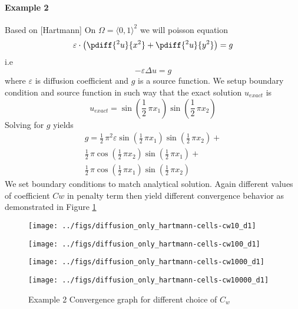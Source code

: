 \newpage
\paragraph{Example 2} Based on [Hartmann]
On $\Omega = \langle 0, 1 \rangle^2$ we will poisson equation
\begin{equation}
\varepsilon \cdot \left( \pdiff{^2 u}{x^2} + \pdiff{^2 u}{y^2} \right) = g
\end{equation}
i.e
\begin{equation}
- \varepsilon \Delta u = g
\end{equation}
where  $\varepsilon$ is diffusion coefficient and $g$ is a source 
function. We setup boundary condition and source function in such way that the exact solution $u_{exact}$ is
\begin{equation}
u_{exact} =  \sin\left(\frac{1}{2} \, \pi x_{1}\right) \sin\left(\frac{1}{2} \, \pi x_{2}\right)
\end{equation}
Solving for $g$ yields
\begin{equation}
\begin{aligned}
	g = \frac{1}{2} \, \pi^{2} \varepsilon \sin\left(\frac{1}{2} \, \pi x_{1}\right) \sin\left(\frac{1}{2} \, \pi 
		x_{2}\right) +\\ \frac{1}{2} \, \pi \cos\left(\frac{1}{2} \, \pi x_{2}\right) \sin\left(\frac{1}{2} \, \pi 
		x_{1}\right) + \\\frac{1}{2} \, \pi \cos\left(\frac{1}{2} \, \pi x_{1}\right) \sin\left(\frac{1}{2} \, \pi 
		x_{2}\right)
\end{aligned}
\end{equation}
We set boundary conditions to match analytical solution.
Again different values of coefficient $Cw$ in penalty term then yield different convergence behavior as demonstrated in 
Figure \ref{fig:conv2}

\begin{figure}[ht]
	\begin{minipage}[b]{0.5\linewidth}
		\texttt{[image: ../figs/diffusion\_only\_hartmann-cells-cw10\_d1]}
	\end{minipage}
	\begin{minipage}[b]{0.5\linewidth}
		\texttt{[image: ../figs/diffusion\_only\_hartmann-cells-cw100\_d1]}
	\end{minipage}

	\begin{minipage}[b]{0.5\linewidth}
		\texttt{[image: ../figs/diffusion\_only\_hartmann-cells-cw1000\_d1]}
	\end{minipage}
	\begin{minipage}[b]{0.5\linewidth}
		\texttt{[image: ../figs/diffusion\_only\_hartmann-cells-cw10000\_d1]}
	\end{minipage}
	
	\caption{Example 2 Convergence graph for different choice of $C_w$}
	\label{fig:conv2}
\end{figure}
